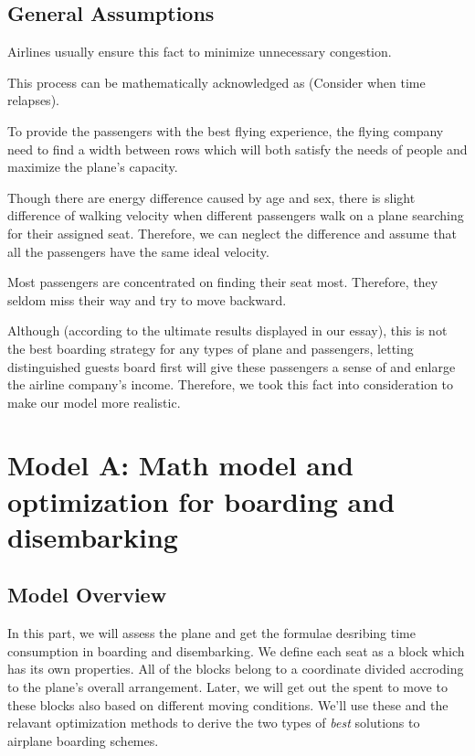 \documentclass{article}
\theoremstyle{definition}
\theoremstyle{remark}
\numberwithin{equation}{section}
\begin{document}
	\subsection{General Assumptions}
	\begin{enumerate}

		Airlines usually ensure this fact to minimize unnecessary congestion.

		This process can be mathematically acknowledged as  (Consider when time relapses).

		To provide the passengers with the best flying experience, the flying company need to find a width between rows which will both satisfy the needs of people and maximize the plane's capacity.

		Though there are energy difference caused by age and sex, there is slight difference of walking velocity when different passengers walk on a plane searching for their assigned seat. Therefore, we can neglect the difference and assume that all the passengers have the same ideal velocity.

		Most passengers are concentrated on finding their seat most. Therefore, they seldom miss their way and try to move backward.

		Although (according to the ultimate results displayed in our essay), this is not the best boarding strategy for any types of plane and passengers, letting distinguished guests board first will give these passengers a sense of  and enlarge the airline company's income. Therefore, we took this fact into consideration to make our model more realistic.
	\end{enumerate}
	\section{Model A: Math model and optimization for boarding and disembarking}
	\subsection{Model Overview}
	In this part, we will assess the plane and get the formulae desribing time consumption in boarding and disembarking. We define each seat as a block which has its own properties. All of the blocks belong to a coordinate divided accroding to the plane's overall arrangement. Later, we will get out the spent to move to these blocks also based on different moving conditions. We'll use these and the relavant optimization methods to derive the two types of \textit{best} solutions to airplane boarding schemes.
\end{document}
